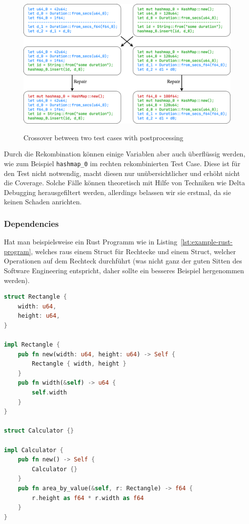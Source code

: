 \documentclass{article}
\begin{document}
\begin{figure}[h]
\caption{Crossover between two test cases with postprocessing}
\centering
\includegraphics[width=\textwidth]{crossover}
\label{fig:crossover-example}
\end{figure}

Durch die Rekombination können einige Variablen aber auch überflüssig werden, wie zum Beispiel \lstinline{hashmap_0} im rechten rekombinierten Test Case. Diese ist für den Test nicht notwendig, macht diesen nur unübersichtlicher und erhöht nicht die Coverage. Solche Fälle können theoretisch mit Hilfe von Techniken wie Delta Debugging herausgefiltert werden, allerdings belassen wir sie erstmal, da sie keinen Schaden anrichten.

\subsubsection{Dependencies}
Hat man beispielsweise ein Rust Programm wie in Listing~\ref{lst:example-rust-program}, welches raus einem Struct für Rechtecke und einem Struct, welcher Operationen auf dem Rechteck durchführt (was nicht ganz der guten Sitten des Software Engineering entspricht, daher sollte ein besseres Beispiel hergenommen werden).

\begin{lstlisting}[language=Rust, style=boxed, caption=Ein Beispiel für ein Rust Program, label=lst:example-rust-program]
struct Rectangle {
    width: u64,
    height: u64,
}

impl Rectangle {
    pub fn new(width: u64, height: u64) -> Self {
        Rectangle { width, height }
    }
    pub fn width(&self) -> u64 {
        self.width
    }
}

struct Calculator {}

impl Calculator {
    pub fn new() -> Self {
        Calculator {}
    }
    pub fn area_by_value(&self, r: Rectangle) -> f64 {
        r.height as f64 * r.width as f64
    }
}
\end{lstlisting}
\end{document}
